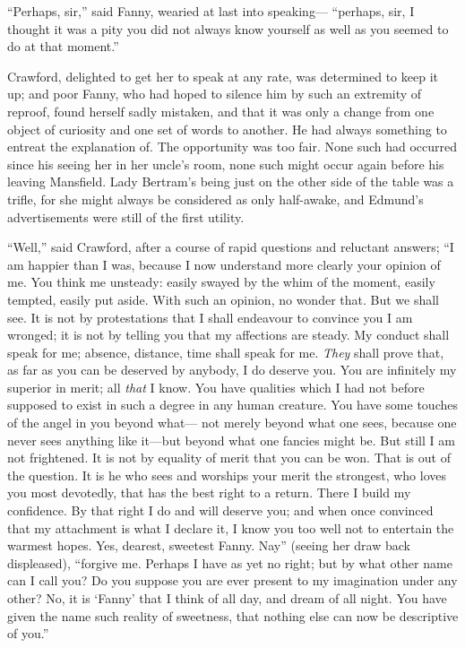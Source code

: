 ``Perhaps, sir,'' said Fanny, wearied at last into speaking---%
``perhaps, sir, I thought it was a pity you did not always
know yourself as well as you seemed to do at that moment.''

Crawford, delighted to get her to speak at any rate,
was determined to keep it up; and poor Fanny, who had
hoped to silence him by such an extremity of reproof,
found herself sadly mistaken, and that it was only a change
from one object of curiosity and one set of words to another.
He had always something to entreat the explanation of.
The opportunity was too fair.  None such had occurred
since his seeing her in her uncle's room, none such might
occur again before his leaving Mansfield.  Lady Bertram's
being just on the other side of the table was a trifle,
for she might always be considered as only half-awake, and
Edmund's advertisements were still of the first utility.

``Well,'' said Crawford, after a course of rapid questions
and reluctant answers; ``I am happier than I was, because I
now understand more clearly your opinion of me.  You think
me unsteady:  easily swayed by the whim of the moment,
easily tempted, easily put aside.  With such an opinion,
no wonder that.  But we shall see.  It is not by protestations
that I shall endeavour to convince you I am wronged;
it is not by telling you that my affections are steady.
My conduct shall speak for me; absence, distance, time shall
speak for me.  \emph{They} shall prove that, as far as you
can be deserved by anybody, I do deserve you.  You are
infinitely my superior in merit; all \emph{that} I know.
You have qualities which I had not before supposed
to exist in such a degree in any human creature.
You have some touches of the angel in you beyond what---%
not merely beyond what one sees, because one never sees
anything like it---but beyond what one fancies might be.
But still I am not frightened.  It is not by equality of
merit that you can be won.  That is out of the question.
It is he who sees and worships your merit the strongest,
who loves you most devotedly, that has the best
right to a return.  There I build my confidence.
By that right I do and will deserve you; and when once
convinced that my attachment is what I declare it,
I know you too well not to entertain the warmest hopes.
Yes, dearest, sweetest Fanny.  Nay'' (seeing her draw back
displeased), ``forgive me.  Perhaps I have as yet no right;
but by what other name can I call you?  Do you suppose
you are ever present to my imagination under any other?
No, it is `Fanny' that I think of all day, and dream
of all night.  You have given the name such reality
of sweetness, that nothing else can now be descriptive
of you.''

